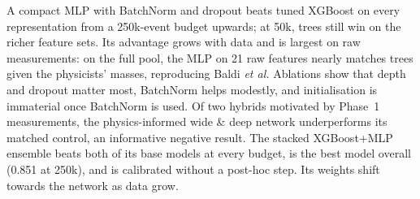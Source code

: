 A compact MLP with BatchNorm and dropout beats tuned XGBoost on every representation from a
250k-event budget upwards; at 50k, trees still win on the richer feature sets. Its advantage grows with data and is largest on raw
measurements: on the full pool, the MLP on 21 raw features nearly matches trees given the
physicists' masses, reproducing Baldi \emph{et al.} Ablations show that depth and dropout matter
most, BatchNorm helps modestly, and initialisation is immaterial once BatchNorm is used. Of two
hybrids motivated by Phase~1 measurements, the physics-informed wide \& deep network underperforms
its matched control, an informative negative result. The stacked XGBoost+MLP ensemble beats both of
its base models at every budget, is the best model overall (0.851 at 250k), and is calibrated without
a post-hoc step. Its weights shift towards the network as data grow.
